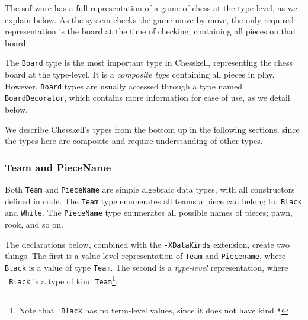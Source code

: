 \documentclass[12pt, a4paper, bibliography=totocnumbered]{scrartcl}
\begin{document}
The software has a full representation of a game of chess at the type-level, as we explain below. As the system checks the game move by move, the only required representation is the board at the time of checking; containing all pieces on that board.

The \lstinline[basicstyle=\ttfamily]{Board} type is the most important type in Chesskell, representing the chess board at the type-level. It is a \emph{composite type} containing all pieces in play. However, \lstinline[basicstyle=\ttfamily]{Board} types are usually accessed through a type named \lstinline[basicstyle=\ttfamily]{BoardDecorator}, which contains more information for ease of use, as we detail below.

We describe Chesskell's types from the bottom up in the following sections, since the types here are composite and require understanding of other types.

\subsubsection{Team and PieceName}

Both \lstinline[basicstyle=\ttfamily]{Team} and \lstinline[basicstyle=\ttfamily]{PieceName} are simple algebraic data types, with all constructors defined in code. The \lstinline[basicstyle=\ttfamily]{Team} type enumerates all teams a piece can belong to; \lstinline[basicstyle=\ttfamily]{Black} and \lstinline[basicstyle=\ttfamily]{White}. The \lstinline[basicstyle=\ttfamily]{PieceName} type enumerates all possible names of pieces; pawn, rook, and so on.

The declarations below, combined with the \lstinline[basicstyle=\ttfamily]{-XDataKinds} extension, create two things. The first is a value-level representation of \lstinline[basicstyle=\ttfamily]{Team} and \lstinline[basicstyle=\ttfamily]{Piecename}, where \lstinline[basicstyle=\ttfamily]{Black} is a value of type \lstinline[basicstyle=\ttfamily]{Team}. The second is a \emph{type-level} representation, where \lstinline[basicstyle=\ttfamily]{'Black} is a type of kind \lstinline[basicstyle=\ttfamily]{Team}\footnote{Note that \lstinline[basicstyle=\ttfamily]{'Black} has no term-level values, since it does not have kind \lstinline[basicstyle=\ttfamily]{*}}.

\end{document}

